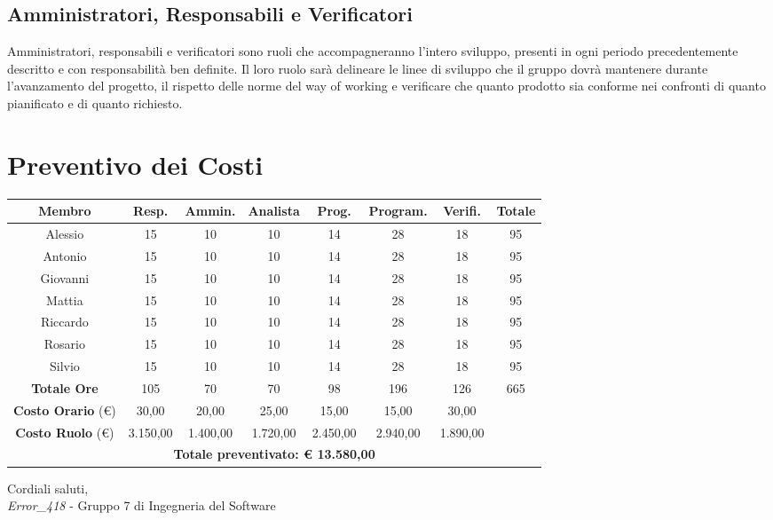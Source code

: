 \documentclass[a4paper, twoside]{article}
\begin{document}
\subsection{Amministratori, Responsabili e Verificatori}
Amministratori, responsabili e verificatori sono ruoli che accompagneranno l'intero sviluppo, presenti in ogni periodo precedentemente descritto e con responsabilità ben definite. Il loro ruolo sarà delineare le linee di sviluppo che il gruppo dovrà mantenere durante l'avanzamento del progetto, il rispetto delle norme del way of working e verificare che quanto prodotto sia conforme nei confronti di quanto pianificato e di quanto richiesto.

\section{Preventivo dei Costi}
\begin{center}
    \begin{tabular}{ |c|c|c|c|c|c|c|c| }
        \hline
        \textbf{Membro} & \textbf{Resp.} & \textbf{Ammin.} & \textbf{Analista} & \textbf{Prog.} & \textbf{Program.} & \textbf{Verifi.} & \textbf{Totale} \\
        \hline
        Alessio & 15 & 10 & 10 & 14 & 28 & 18 & 95 \\
        \hline
        Antonio & 15 & 10 & 10 & 14 & 28 & 18 & 95 \\
        \hline
        Giovanni & 15 & 10 & 10 & 14 & 28 & 18 & 95 \\
        \hline
        Mattia & 15 & 10 & 10 & 14 & 28 & 18 & 95 \\
        \hline
        Riccardo & 15 & 10 & 10 & 14 & 28 & 18 & 95 \\
        \hline
        Rosario & 15 & 10 & 10 & 14 & 28 & 18 & 95 \\
        \hline
        Silvio & 15 & 10 & 10 & 14 & 28 & 18 & 95 \\
        \hline
        \hline
        \textbf{Totale Ore} & 105 & 70 & 70 & 98 & 196 & 126 & 665 \\
        \hline
        \textbf{Costo Orario} (€) & 30,00 & 20,00 & 25,00 & 15,00 & 15,00 & 30,00 &  \\
        \hline
        \textbf{Costo Ruolo} (€) & 3.150,00 & 1.400,00 & 1.720,00 & 2.450,00 & 2.940,00 & 1.890,00 & \\
        \hline
        \multicolumn{8}{|c|}{ \textbf{Totale preventivato: € 13.580,00}} \\
        \hline
    \end{tabular}
\end{center} 

\vspace{1cm}
\noindent
Cordiali saluti,\\
\textit{Error\_418} - Gruppo 7 di Ingegneria del Software
\end{document}

